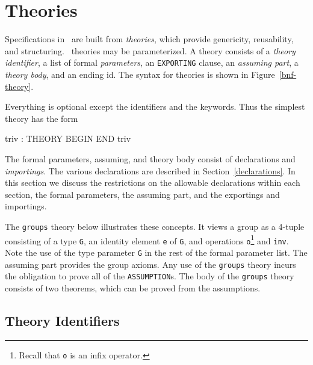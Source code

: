 
\chapter{Theories}\label{theories}

Specifications in \pvs\ are built from \emph{theories}, which provide
genericity, reusability, and structuring.  \pvs\ theories may be
parameterized.  A theory consists of a \emph{theory
identifier}, a list of formal \emph{parameters}, an \texttt{EXPORTING}
clause, an \emph{assuming part}, a \emph{theory body}, and an ending
id.  The syntax for theories is shown in Figure~\ref{bnf-theory}.




Everything is optional except the identifiers and the keywords.  Thus
the simplest theory has the form
\begin{pvsex}
  triv : THEORY
    BEGIN
    END triv
\end{pvsex}

The formal parameters, assuming, and theory body consist of declarations
and \emph{importings}.  The various declarations are described in
Section~\ref{declarations}.  In this section we discuss the restrictions
on the allowable declarations within each section, the formal parameters,
the assuming part, and the exportings and importings.

The \texttt{groups} theory below illustrates these concepts.  It views a
group as a 4-tuple consisting of a type \texttt{G}, an identity element
\texttt{e} of \texttt{G}, and operations \texttt{o}\footnote{Recall that
\texttt{o} is an infix operator.} and \texttt{inv}.  Note the use of the
type parameter \texttt{G} in the rest of the formal parameter list.  The
assuming part provides the group axioms.  Any use of the \texttt{groups}
theory incurs the obligation to prove all of the \texttt{ASSUMPTION}s.
The body of the \texttt{groups} theory consists of two theorems, which can
be proved from the assumptions.


\section{Theory Identifiers}

